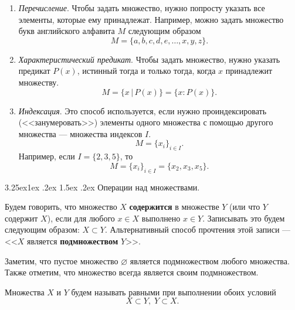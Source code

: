 \documentclass[12pt, russian]{article}
\makeatletter
\renewcommand\subsubsection{\@startsection{subsubsection}{3}{\parindent}%
	{3.25ex\@plus 1ex \@minus .2ex}%
	{1.5ex \@plus .2ex}%
	{\normalfont\large\bfseries}}
\makeatother
\begin{document}
\begin{enumerate}
	\item \textit{Перечисление}. Чтобы задать множество, нужно попросту указать все элементы, которые ему принадлежат. Например, можно задать множество букв английского алфавита $M$ следующим образом
	$$
	M = \{ a, b, c, d, e, \ldots, x, y, z \}.
	$$

	\item \textit{Характеристический предикат}. Чтобы задать множество, нужно указать предикат $P(x)$, истинный тогда и только тогда, когда $x$ принадлежит множеству.
	$$
	M = \{ x \, | \,  P(x)\} = \{ x: P(x)\}.
	$$

	\item \textit{Индексация}. Это способ используется, если нужно проиндексировать (<<занумеровать>>) элементы одного множества с помощью другого множества --- множества индексов $I$. 
	$$
	M = \{ x_i \}_{i \in I}.
	$$
	Например, если $I=\{2,3,5\}$, то
	$$
	M = \{ x_i \}_{i \in I} = \{ x_2, x_3, x_5 \}.
	$$
\end{enumerate}




\subsubsection{Операции над множествами.}

Будем говорить, что множество $X$ \textbf{содержится} в множестве $Y$ (или что $Y$ содержит $X$), если для любого $x \in X$ выполнено $x \in Y$. Записывать это будем следующим образом: $X \subset Y$. Альтернативный способ прочтения этой записи --- <<$X$ является \textbf{подмножеством} $Y$>>.

Заметим, что пустое множество $\varnothing$ является подмножеством любого множества. Также отметим, что множество всегда является своим подмножеством.

Множества $X$ и $Y$ будем называть равными при выполнении обоих условий
$$
X \subset Y, \; Y \subset X.
$$
\end{document}
